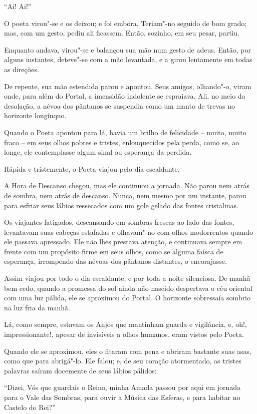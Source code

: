``Ai! Ai!''

O poeta virou"-se e os deixou; e foi embora. Teriam"-no seguido de bom
grado; mas, com um gesto, pediu ali ficassem. Então, sozinho, em seu
pesar, partiu.

Enquanto andava, virou"-se e balançou sua mão num gesto de adeus.
Então, por alguns instantes, deteve"-se com a mão levantada, e a girou
lentamente em todas as direções.

De repente, sua mão estendida parou e apontou. Seus amigos, olhando"-o,
viram onde, para além do Portal, a imensidão indolente se espraiava.
Ali, no meio da desolação, a névoa dos pântanos se suspendia como um
manto de trevas no horizonte longínquo.

Quando o Poeta apontou para lá, havia um brilho de felicidade -- muito,
muito fraco -- em seus olhos pobres e tristes, enlouquecidos pela
perda, como se, ao longe, ele contemplasse algum sinal ou esperança da
perdida.

Rápida e tristemente, o Poeta viajou pelo dia escaldante.

A Hora de Descanso chegou, mas ele continuou a jornada. Não parou nem
atrás de sombra, nem atrás de descanso. Nunca, nem mesmo por um instante, parou
para esfriar seus lábios ressecados com um gole gelado das fontes
cristalinas.

Os viajantes fatigados, descansando em sombras frescas ao lado das
fontes, levantavam suas cabeças estafadas e olhavam"-no com olhos
modorrentos quando ele passava apressado. Ele não lhes prestava
atenção, e continuava sempre em frente com um propósito firme em seus
olhos, como se alguma faísca de esperança, irrompendo das névoas dos
pântanos distantes, o encorajasse.

Assim viajou por todo o dia escaldante, e por toda a noite silenciosa.
De manhã bem cedo, quando a promessa do sol ainda não nascido despertava
o céu oriental com uma luz pálida, ele se aproximou do Portal. O
horizonte sobressaía sombrio na luz fria da manhã.

Lá, como sempre, estavam os Anjos que mantinham guarda e vigilância, e,
oh!, impressionante!, apesar de invisíveis a olhos humanos, eram
vistos pelo Poeta.

Quando ele se aproximou, eles o fitaram com pena e abriram bastante suas
asas, como que para abrigá"-lo. Ele falou; e, de seu coração atormentado,
as tristes palavras saíram docemente de seus lábios pálidos:

``Dizei, Vós que guardais o Reino, minha Amada passou por aqui em
jornada para o Vale das Sombras, para ouvir a Música das Esferas, e para
habitar no Castelo do Rei?''

